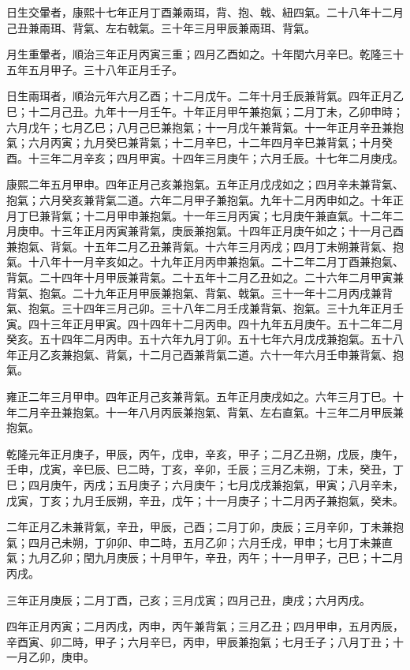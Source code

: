 \begin{pinyinscope}
日生交暈者，康熙十七年正月丁酉兼兩珥，背、抱、戟、紐四氣。二十八年十二月己丑兼兩珥、背氣、左右戟氣。三十年三月甲辰兼兩珥、背氣。

月生重暈者，順治三年正月丙寅三重；四月乙酉如之。十年閏六月辛巳。乾隆三十五年五月甲子。三十八年正月壬子。

日生兩珥者，順治元年六月乙酉；十二月戊午。二年十月壬辰兼背氣。四年正月乙巳；十二月己丑。九年十一月壬午。十年正月甲午兼抱氣；二月丁未，乙卯申時；六月戊午；七月乙巳；八月己巳兼抱氣；十一月戊午兼背氣。十一年正月辛丑兼抱氣；六月丙寅；九月癸巳兼背氣；十二月辛巳，十二年四月辛巳兼背氣；十月癸酉。十三年二月辛亥；四月甲寅。十四年三月庚午；六月壬辰。十七年二月庚戌。

康熙二年五月甲申。四年正月己亥兼抱氣。五年正月戊戌如之；四月辛未兼背氣、抱氣；六月癸亥兼背氣二道。六年二月甲子兼抱氣。九年十二月丙申如之。十年正月丁巳兼背氣；十二月甲申兼抱氣。十一年三月丙寅；七月庚午兼直氣。十二年二月庚申。十三年正月丙寅兼背氣，庚辰兼抱氣。十四年正月庚午如之；十一月己酉兼抱氣、背氣。十五年二月乙丑兼背氣。十六年三月丙戌；四月丁未朔兼背氣、抱氣。十八年十一月辛亥如之。十九年正月丙申兼抱氣。二十二年二月丁酉兼抱氣、背氣。二十四年十月甲辰兼背氣。二十五年十二月乙丑如之。二十六年二月甲寅兼背氣、抱氣。二十九年正月甲辰兼抱氣、背氣、戟氣。三十一年十二月丙戌兼背氣、抱氣。三十四年三月己卯。三十八年二月壬戌兼背氣、抱氣。三十九年正月壬寅。四十三年正月甲寅。四十四年十二月丙申。四十九年五月庚午。五十二年二月癸亥。五十四年二月丙申。五十六年九月丁卯。五十七年六月戊戌兼抱氣。五十八年正月乙亥兼抱氣、背氣，十二月己酉兼背氣二道。六十一年六月壬申兼背氣、抱氣。

雍正二年三月甲申。四年正月己亥兼背氣。五年正月庚戌如之。六年三月丁巳。十年二月辛丑兼抱氣。十一年八月丙辰兼抱氣、背氣、左右直氣。十三年二月甲辰兼抱氣。

乾隆元年正月庚子，甲辰，丙午，戊申，辛亥，甲子；二月乙丑朔，戊辰，庚午，壬申，戊寅，辛巳辰、巳二時，丁亥，辛卯，壬辰；三月乙未朔，丁未，癸丑，丁巳；四月庚午，丙戌；五月庚子；六月庚午；七月戊戌兼抱氣，甲寅；八月辛未，戊寅，丁亥；九月壬辰朔，辛丑，戊午；十一月庚子；十二月丙子兼抱氣，癸未。

二年正月乙未兼背氣，辛丑，甲辰，己酉；二月丁卯，庚辰；三月辛卯，丁未兼抱氣；四月己未朔，丁卯卯、申二時，五月乙卯；六月壬戌，甲申；七月丁未兼直氣；九月乙卯；閏九月庚辰；十月甲午，辛丑，丙午；十一月甲子，己巳；十二月丙戌。

三年正月庚辰；二月丁酉，己亥；三月戊寅；四月己丑，庚戌；六月丙戌。

四年正月丙寅；二月丙戌，丙申，丙午兼背氣；三月乙丑；四月甲申，五月丙辰，辛酉寅、卯二時，甲子；六月辛巳，丙申，甲辰兼抱氣；七月壬子；八月丁丑；十一月乙卯，庚申。


\end{pinyinscope}

